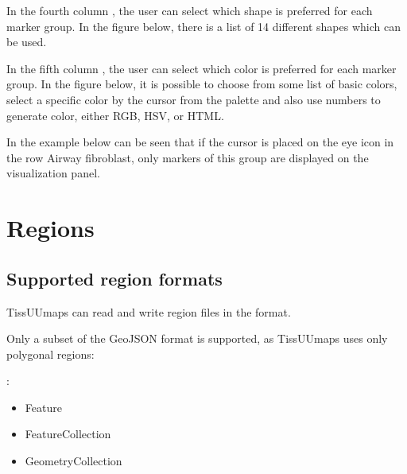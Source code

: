 \documentclass[letterpaper,10pt,english,openany,oneside]{sphinxmanual}
\begin{document}
\sphinxAtStartPar
{}

\sphinxAtStartPar
In the fourth column , the user can select which shape is preferred for each marker group. In the figure below, there is a list of 14 different shapes which can be used.

\sphinxAtStartPar
{}

\sphinxAtStartPar
In the fifth column , the user can select which color is preferred for each marker group. In the figure below, it is possible to choose from some list of basic colors, select a specific color by the cursor from the palette and also use numbers to generate color, either RGB, HSV, or HTML.

\sphinxAtStartPar
{}

\sphinxAtStartPar
In the example below can be seen that if the cursor is placed on the eye icon in the row Airway fibroblast, only markers of this group are displayed on the visualization panel.

\sphinxAtStartPar
{}

\sphinxstepscope


\section{Regions}
\label{\detokenize{docs/starting/regions:regions}}\label{\detokenize{docs/starting/regions::doc}}

\subsection{Supported region formats}
\label{\detokenize{docs/starting/regions:supported-region-formats}}
\sphinxAtStartPar
TissUUmaps can read and write region files in the  format.

\sphinxAtStartPar
Only a subset of the GeoJSON format is supported, as TissUUmaps uses only polygonal regions:

\sphinxAtStartPar
{}:
\begin{itemize}
\item {} 
\sphinxAtStartPar
Feature

\item {} 
\sphinxAtStartPar
FeatureCollection

\item {} 
\sphinxAtStartPar
GeometryCollection

\end{itemize}
\end{document}
